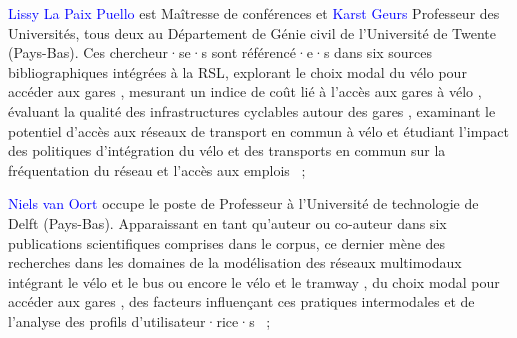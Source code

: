 \begin{refsegment}
\begin{customitemize}
        \item \textcolor{blue}{Lissy La Paix Puello} est Maîtresse de conférences et \textcolor{blue}{Karst Geurs} Professeur des Universités, tous deux au Département de Génie civil de l'Université de Twente (Pays-Bas). Ces chercheur·se·s sont référencé·e·s dans six sources bibliographiques intégrées à la \acrshort{RSL}, explorant le choix modal du vélo pour accéder aux gares \textcolor{blue}{\autocite{la_paix_puello_modelling_2015,la_paix_puello_train_2016}}, mesurant un indice de coût lié à l'accès aux gares à vélo \textcolor{blue}{\autocite{la_paix_puello_integration_2016}}, évaluant la qualité des infrastructures cyclables autour des gares \textcolor{blue}{\autocite{la_paix_puello_role_2021}}, examinant le potentiel d'accès aux réseaux de transport en commun à vélo \textcolor{blue}{\autocite{souza_modelling_2017}} et étudiant l'impact des politiques d'intégration du vélo et des transports en commun sur la fréquentation du réseau et l'accès aux emplois \textcolor{blue}{\autocite{geurs_multi-modal_2016}}~;
        \item \textcolor{blue}{Niels van Oort} occupe le poste de Professeur à l'Université de technologie de Delft (Pays-Bas). Apparaissant en tant qu'auteur ou co-auteur dans six publications scientifiques comprises dans le corpus, ce dernier mène des recherches dans les domaines de la modélisation des réseaux multimodaux intégrant le vélo et le bus \textcolor{blue}{\autocite{brand_modelling_2017}} ou encore le vélo et le tramway \textcolor{blue}{\autocite{rijsman_walking_2019}}, du choix modal pour accéder aux gares \textcolor{blue}{\autocite{shelat_analysing_2018}}, des facteurs influençant ces pratiques intermodales \textcolor{blue}{\autocite{ton_understanding_2020}} et de l'analyse des profils d'utilisateur·rice·s \textcolor{blue}{\autocites{mil_insights_2020}{kuijk_preferences_2022}}~;

\end{customitemize}
\end{refsegment}
